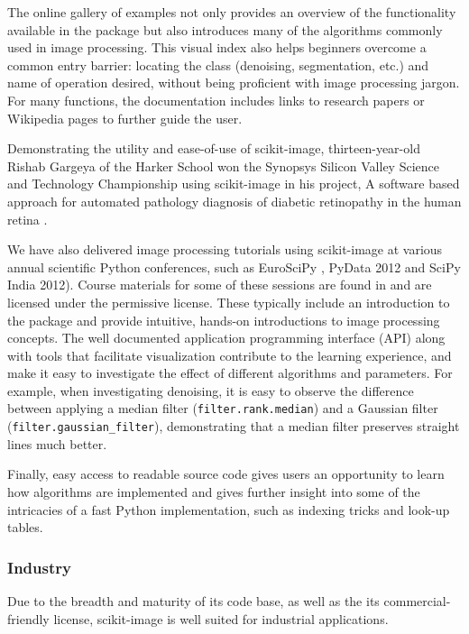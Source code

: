 \documentclass[letterpaper,compsoc,twoside]{IEEEtran}
\begin{document}
The online gallery of examples not only provides
an overview of the functionality available in the package but also
introduces many of the algorithms commonly used in image processing.
This visual index also helps beginners overcome a common entry barrier:
locating the class (denoising, segmentation, etc.) and name of operation
desired, without being proficient with image processing jargon.  For many
functions, the documentation includes links to research papers or Wikipedia
pages to further guide the user.

Demonstrating the utility and ease-of-use of scikit-image, thirteen-year-old
Rishab Gargeya of the Harker School won the Synopsys Silicon
Valley Science and Technology Championship using scikit-image in
his project, \textquotedbl{}A software based approach for automated pathology diagnosis of
diabetic retinopathy in the human retina\textquotedbl{} \cite{sciencefair}.

We have also delivered
image processing tutorials using scikit-image at various
annual scientific Python conferences, such as EuroSciPy \cite{euroscipy2013}, PyData
2012 \cite{pydata2012} and SciPy India
2012). Course materials for some of these sessions are found in
\cite{scipylecturenotes} and are licensed under the permissive \cite{cc-by}
license.  These typically include an introduction to the package and provide
intuitive, hands-on introductions to image processing concepts. The well
documented application programming interface (API) along with tools that
facilitate visualization contribute to the learning experience, and make it
easy to investigate the effect of different algorithms and parameters.
For example, when investigating denoising, it is easy to observe the difference
between applying a median filter (\texttt{filter.rank.median}) and a
Gaussian filter (\texttt{filter.gaussian\_filter}),
demonstrating that a median filter preserves straight lines much better.

Finally, easy access to readable source code gives users an opportunity to
learn how algorithms are implemented and gives further insight into some of the
intricacies of a fast Python implementation, such as indexing tricks
and look-up tables.

\subsubsection{Industry%
  \label{industry}%
}


Due to the breadth and maturity of its code base, as well as the its
commercial-friendly license, scikit-image is well suited for
industrial applications.
\end{document}
